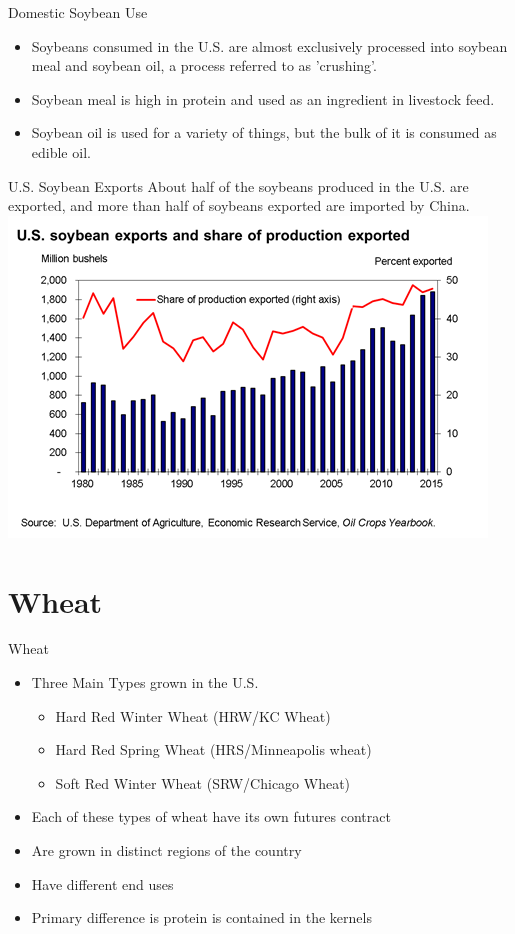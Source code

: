 \documentclass{beamer}
\begin{document}
\begin{frame}{Domestic Soybean Use}
\begin{itemize}
\item Soybeans consumed in the U.S. are almost exclusively processed into soybean meal and soybean oil, a process referred to as 'crushing'. 
\item Soybean meal is high in protein and used as an ingredient in livestock feed.
\item Soybean oil is used for a variety of things, but the bulk of it is consumed as edible oil.
\end{itemize}
\end{frame}

\begin{frame}{U.S. Soybean Exports}
About half of the soybeans produced in the U.S. are exported, and more than half of soybeans exported are imported by China.
\includegraphics[width=.75\textwidth]{Soy-Exports-Share-Production.png}
\end{frame}

\section{Wheat}

\begin{frame}[<+-| alert@+>]{Wheat}
\begin{itemize}
\item Three Main Types grown in the U.S.
\begin{itemize}
\item Hard Red Winter Wheat (HRW/KC Wheat)
\item Hard Red Spring Wheat (HRS/Minneapolis wheat)
\item Soft Red Winter Wheat (SRW/Chicago Wheat)
\end{itemize}
\item Each of these types of wheat have its own futures contract
\item Are grown in distinct regions of the country
\item Have different end uses
\item Primary difference is protein is contained in the kernels
\end{itemize}
\end{frame}
\end{document}
